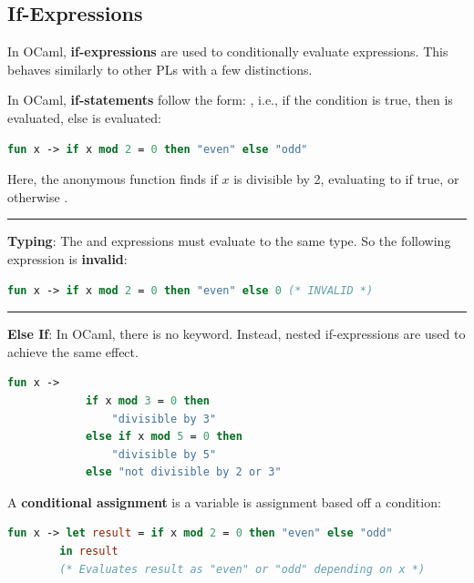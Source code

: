 \newpage
\subsection{If-Expressions}
In OCaml, \textbf{if-expressions} are used to conditionally evaluate expressions. This behaves similarly to other PLs with a few distinctions.

\begin{Def}

    In OCaml, \textbf{if-statements} follow the form: , i.e., 
    if the condition is true, then  is evaluated, else  is evaluated:
    \begin{lstlisting}[language=OCaml, caption={If-Expression: Divisible by 2}, numbers=none]
        fun x -> if x mod 2 = 0 then "even" else "odd"
    \end{lstlisting}

    \noindent
    Here, the anonymous function finds if $x$ is divisible by 2, evaluating to  if true, or otherwise .

    \noindent
    \rule{\textwidth}{0.4pt}

    \vspace{.3em}
    \noindent
    \textbf{Typing}: The  and  expressions must evaluate to the same type. 
    So the following expression is \textbf{invalid}:

    \begin{lstlisting}[language=OCaml, caption={Invalid If-Expression}, numbers=none]
        fun x -> if x mod 2 = 0 then "even" else 0 (* INVALID *)
    \end{lstlisting}

    \noindent
    \rule{\textwidth}{0.4pt}

    \vspace{.3em}
    \noindent
    \textbf{Else If}: In OCaml, there is no  keyword. Instead, nested if-expressions are used to achieve the same effect.

    \begin{lstlisting}[language=OCaml, caption={Else If Example}, numbers=none]
        fun x -> 
            if x mod 3 = 0 then 
                "divisible by 3"
            else if x mod 5 = 0 then
                "divisible by 5" 
            else "not divisible by 2 or 3"
    \end{lstlisting}
\end{Def}
\begin{Def}

    A \textbf{conditional assignment} is a variable is assignment based off a condition:
    \begin{lstlisting}[language=OCaml, caption={Conditional Assignment}, numbers=none]
        fun x -> let result = if x mod 2 = 0 then "even" else "odd" 
        in result
        (* Evaluates result as "even" or "odd" depending on x *)
    \end{lstlisting}
\end{Def}


